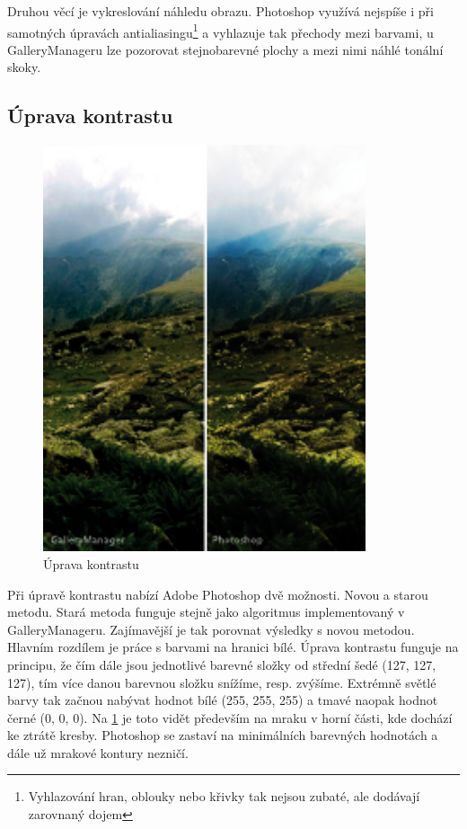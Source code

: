 \documentclass[11pt,twoside,a4paper]{book}
\begin{document}
\indent
Druhou věcí je vykreslování náhledu obrazu. Photoshop využívá nejspíše i při samotných úpravách antialiasingu\footnote{Vyhlazování hran, oblouky nebo křivky tak nejsou zubaté, ale dodávají zarovnaný dojem} a vyhlazuje tak přechody mezi barvami, u GalleryManageru lze pozorovat stejnobarevné plochy a mezi nimi náhlé tonální skoky.

\subsection{Úprava kontrastu}
\begin{figure}[ht]
\begin{center}
\includegraphics[width=9.5cm]{figures/contrast}
\caption{Úprava kontrastu}
\label{fig:contrast}
\end{center}
\end{figure}

\noindent
Při úpravě kontrastu nabízí Adobe Photoshop dvě možnosti. Novou a starou metodu. Stará metoda funguje stejně jako algoritmus implementovaný v GalleryManageru. Zajímavější je tak porovnat výsledky s novou metodou. Hlavním rozdílem je práce s barvami na hranici bílé. Úprava kontrastu funguje na principu, že čím dále jsou jednotlivé barevné složky od střední šedé (127, 127, 127), tím více danou barevnou složku snížíme, resp. zvýšíme. Extrémně světlé barvy tak začnou nabývat hodnot bílé (255, 255, 255) a tmavé naopak hodnot černé (0, 0, 0). Na \ref{fig:contrast} je toto vidět především na mraku v horní části, kde dochází ke ztrátě kresby. Photoshop se zastaví na minimálních barevných hodnotách a dále už mrakové kontury nezničí.
\end{document}
